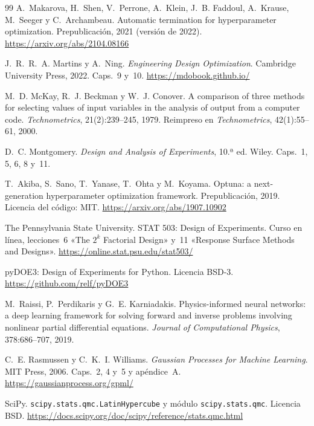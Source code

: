 \begin{thebibliography}{99}
A.~Makarova, H.~Shen, V.~Perrone, A.~Klein, J.~B. Faddoul, A.~Krause, M.~Seeger y C.~Archambeau.
\newblock Automatic termination for hyperparameter optimization.
\newblock Prepublicación, 2021 (versión de 2022).
\newblock \url{https://arxiv.org/abs/2104.08166}

J.~R.~R.~A. Martins y A.~Ning.
\newblock \emph{Engineering Design Optimization}.
\newblock Cambridge University Press, 2022. Caps.~9 y~10.
\newblock \url{https://mdobook.github.io/}

M.~D. McKay, R.~J. Beckman y W.~J. Conover.
\newblock A comparison of three methods for selecting values of input variables in the analysis of output from a computer code.
\newblock \emph{Technometrics}, 21(2):239--245, 1979. Reimpreso en \emph{Technometrics}, 42(1):55--61, 2000.

D.~C. Montgomery.
\newblock \emph{Design and Analysis of Experiments}, 10.ª ed.
\newblock Wiley. Caps.~1, 5, 6, 8 y~11.

T.~Akiba, S.~Sano, T.~Yanase, T.~Ohta y M.~Koyama.
\newblock Optuna: a next-generation hyperparameter optimization framework.
\newblock Prepublicación, 2019. Licencia del código: MIT.
\newblock \url{https://arxiv.org/abs/1907.10902}

The Pennsylvania State University.
\newblock STAT 503: Design of Experiments.
\newblock Curso en línea, lecciones~6 «The $2^k$ Factorial Design» y~11 «Response Surface Methods and Designs».
\newblock \url{https://online.stat.psu.edu/stat503/}

pyDOE3: Design of Experiments for Python. Licencia BSD-3.
\newblock \url{https://github.com/relf/pyDOE3}

M.~Raissi, P.~Perdikaris y G.~E. Karniadakis.
\newblock Physics-informed neural networks: a deep learning framework for solving forward and inverse problems involving nonlinear partial differential equations.
\newblock \emph{Journal of Computational Physics}, 378:686--707, 2019.

C.~E. Rasmussen y C.~K.~I. Williams.
\newblock \emph{Gaussian Processes for Machine Learning}.
\newblock MIT Press, 2006. Caps.~2, 4 y~5 y apéndice~A.
\newblock \url{https://gaussianprocess.org/gpml/}

SciPy.
\newblock \texttt{scipy.stats.qmc.LatinHypercube} y módulo \texttt{scipy.stats.qmc}. Licencia BSD.
\newblock \url{https://docs.scipy.org/doc/scipy/reference/stats.qmc.html}


\end{thebibliography}
